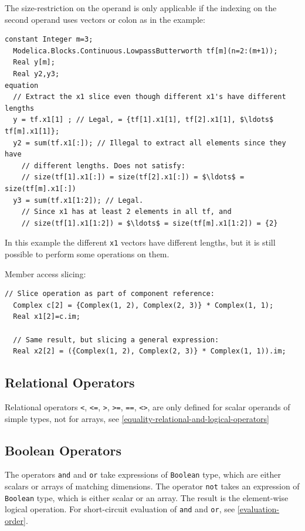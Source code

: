 \begin{example}
The size-restriction on the operand is only applicable if the indexing on the second operand uses vectors or colon as in the example:
\begin{lstlisting}[language=modelica]
  constant Integer m=3;
  Modelica.Blocks.Continuous.LowpassButterworth tf[m](n=2:(m+1));
  Real y[m];
  Real y2,y3;
equation
  // Extract the x1 slice even though different x1's have different lengths
  y = tf.x1[1] ; // Legal, = {tf[1].x1[1], tf[2].x1[1], $\ldots$ tf[m].x1[1]};
  y2 = sum(tf.x1[:]); // Illegal to extract all elements since they have
    // different lengths. Does not satisfy:
    // size(tf[1].x1[:]) = size(tf[2].x1[:]) = $\ldots$ = size(tf[m].x1[:])
  y3 = sum(tf.x1[1:2]); // Legal.
    // Since x1 has at least 2 elements in all tf, and
    // size(tf[1].x1[1:2]) = $\ldots$ = size(tf[m].x1[1:2]) = {2}
\end{lstlisting}
In this example the different \lstinline!x1! vectors have different lengths, but it is still possible to perform some operations on them.
\end{example}

\begin{example}
Member access slicing:
\begin{lstlisting}[language=modelica]
  // Slice operation as part of component reference:
  Complex c[2] = {Complex(1, 2), Complex(2, 3)} * Complex(1, 1);
  Real x1[2]=c.im;

  // Same result, but slicing a general expression:
  Real x2[2] = ({Complex(1, 2), Complex(2, 3)} * Complex(1, 1)).im;
\end{lstlisting}
\end{example}

\subsection{Relational Operators}\label{relational-operators}

Relational operators \lstinline!<!, \lstinline!<=!, \lstinline!>!, \lstinline!>=!, \lstinline!==!, \lstinline!<>!, are only defined for scalar operands of simple types, not for arrays, see \cref{equality-relational-and-logical-operators}

\subsection{Boolean Operators}\label{boolean-operators}

The operators \lstinline!and! and \lstinline!or! take expressions of \lstinline!Boolean! type, which are either scalars or arrays of matching dimensions.
The operator \lstinline!not! takes an expression of \lstinline!Boolean! type, which is either scalar or an array.
The result is the element-wise logical operation.
For short-circuit evaluation of \lstinline!and! and \lstinline!or!, see \cref{evaluation-order}.

